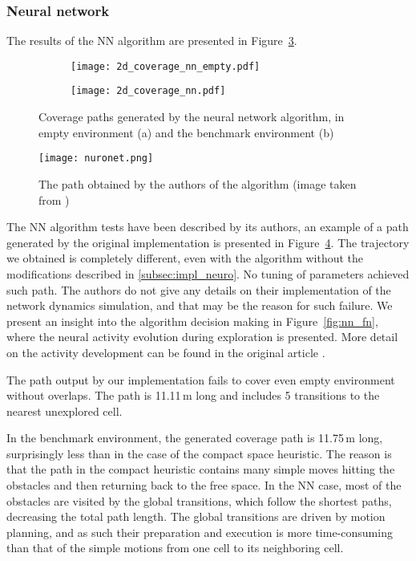 \documentclass[buriama8_dp.tex]{subfiles}
\begin{document}
\subsubsection{Neural network}
The results of the NN algorithm are presented in Figure~\ref{fig:nn_2d_coverage}.

\begin{figure}[htp]
  \centering
  \begin{subfigure}[t]{0.49\textwidth}
    \texttt{[image: 2d\_coverage\_nn\_empty.pdf]}
    \caption{}
    \label{fig:nn_2d_empty}
  \end{subfigure}
  \begin{subfigure}[t]{0.49\textwidth}
    \texttt{[image: 2d\_coverage\_nn.pdf]}
    \caption{}
    \label{fig:nn_2d_env}
  \end{subfigure}

  \caption[Coverage path -- neural network in 2D]{Coverage paths generated by the neural network algorithm, in empty environment (a) and the benchmark environment (b)}
  \label{fig:nn_2d_coverage}
\end{figure}

\begin{figure}[htp]
  \centering
  \texttt{[image: nuronet.png]}
  \caption[Original neural network path]{The path obtained by the authors of the algorithm (image taken from \cite{neural})}
  \label{fig:nn_article}
\end{figure}

The NN algorithm tests have been described by its authors, an example of a path generated by the original implementation is presented in Figure~\ref{fig:nn_article}. The trajectory we obtained is completely different, even with the algorithm without the modifications described in \ref{subsec:impl_neuro}. No tuning of parameters achieved such path. The authors do not give any details on their implementation of the network dynamics simulation, and that may be the reason for such failure. We present an insight into the algorithm decision making in Figure~\ref{fig:nn_fn}, where the neural activity evolution during exploration is presented. More detail on the activity development can be found in the original article \cite{neural}. 

The path output by our implementation fails to cover even empty environment without overlaps. The path is 11.11\,m long and includes 5 transitions to the nearest unexplored cell.

In the benchmark environment, the generated coverage path is 11.75\,m long, surprisingly less than in the case of the compact space heuristic. The reason is that the path in the compact heuristic contains many simple moves hitting the obstacles and then returning back to the free space. In the NN case, most of the obstacles are visited by the global transitions, which follow the shortest paths, decreasing the total path length. The global transitions are driven by motion planning, and as such their preparation and execution is more time-consuming than that of the simple motions from one cell to its neighboring cell.
\end{document}
